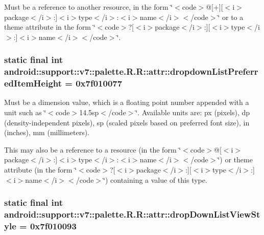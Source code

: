 Must be a reference to another resource, in the form \char`\"{}$<$code$>$@\mbox{[}+\mbox{]}\mbox{[}$<$i$>$package$<$/i$>$:\mbox{]}$<$i$>$type$<$/i$>$:$<$i$>$name$<$/i$>$$<$/code$>$\char`\"{} or to a theme attribute in the form \char`\"{}$<$code$>$?\mbox{[}$<$i$>$package$<$/i$>$:\mbox{]}\mbox{[}$<$i$>$type$<$/i$>$:\mbox{]}$<$i$>$name$<$/i$>$$<$/code$>$\char`\"{}. \hypertarget{classandroid_1_1support_1_1v7_1_1palette_1_1_r_1_1attr_e1a3f6e0b531bb53973f37194f94f893}{
\subsubsection[{dropdownListPreferredItemHeight}]{\setlength{\rightskip}{0pt plus 5cm}static final int android::support::v7::palette.R.R::attr::dropdownListPreferredItemHeight = 0x7f010077}}
\label{classandroid_1_1support_1_1v7_1_1palette_1_1_r_1_1attr_e1a3f6e0b531bb53973f37194f94f893}


Must be a dimension value, which is a floating point number appended with a unit such as \char`\"{}$<$code$>$14.5sp$<$/code$>$\char`\"{}. Available units are: px (pixels), dp (density-independent pixels), sp (scaled pixels based on preferred font size), in (inches), mm (millimeters). 

This may also be a reference to a resource (in the form \char`\"{}$<$code$>$@\mbox{[}$<$i$>$package$<$/i$>$:\mbox{]}$<$i$>$type$<$/i$>$:$<$i$>$name$<$/i$>$$<$/code$>$\char`\"{}) or theme attribute (in the form \char`\"{}$<$code$>$?\mbox{[}$<$i$>$package$<$/i$>$:\mbox{]}\mbox{[}$<$i$>$type$<$/i$>$:\mbox{]}$<$i$>$name$<$/i$>$$<$/code$>$\char`\"{}) containing a value of this type. \hypertarget{classandroid_1_1support_1_1v7_1_1palette_1_1_r_1_1attr_70723506508d2492cc444e6b1e20a0a9}{
\subsubsection[{dropDownListViewStyle}]{\setlength{\rightskip}{0pt plus 5cm}static final int android::support::v7::palette.R.R::attr::dropDownListViewStyle = 0x7f010093}}
\label{classandroid_1_1support_1_1v7_1_1palette_1_1_r_1_1attr_70723506508d2492cc444e6b1e20a0a9}


